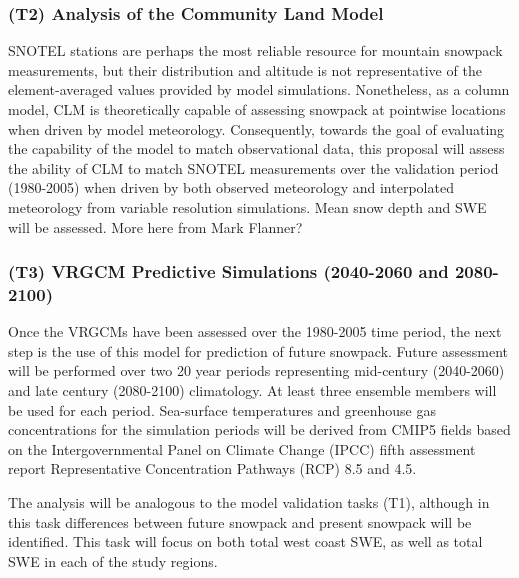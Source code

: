\documentclass[11pt]{article}
\begin{document}
\subsubsection{(T2) Analysis of the Community Land Model}

SNOTEL stations are perhaps the most reliable resource for mountain snowpack measurements, but their distribution and altitude is not representative of the element-averaged values provided by model simulations.  Nonetheless, as a column model, CLM is theoretically capable of assessing snowpack at pointwise locations when driven by model meteorology.  Consequently, towards the goal of evaluating the capability of the model to match observational data, this proposal will assess the ability of CLM to match SNOTEL measurements over the validation period (1980-2005) when driven by both observed meteorology and interpolated meteorology from variable resolution simulations.  Mean snow depth and SWE will be assessed.  {\color{red} More here from Mark Flanner?}

\subsubsection{(T3) VRGCM Predictive Simulations (2040-2060 and 2080-2100)}

Once the VRGCMs have been assessed over the 1980-2005 time period, the next step is the use of this model for prediction of future snowpack.  Future assessment will be performed over two 20 year periods representing mid-century (2040-2060) and late century (2080-2100) climatology.  At least three ensemble members will be used for each period.  Sea-surface temperatures and greenhouse gas concentrations for the simulation periods will be derived from CMIP5 fields based on the Intergovernmental Panel on Climate Change (IPCC) fifth assessment report Representative Concentration Pathways (RCP) 8.5 and 4.5.

The analysis will be analogous to the model validation tasks (T1), although in this task differences between future snowpack and present snowpack will be identified.  This task will focus on both total west coast SWE, as well as total SWE in each of the study regions.


\end{document}
